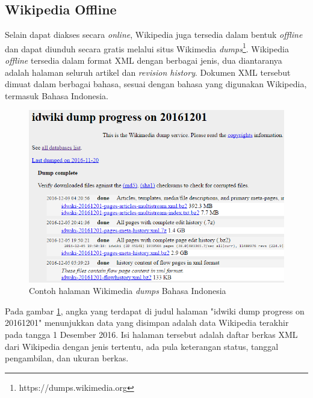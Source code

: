 \subsection{Wikipedia Offline}
Selain dapat diakses secara \textit{online}, Wikipedia juga tersedia dalam bentuk \textit{offline} dan dapat diunduh secara gratis melalui situs Wikimedia \textit{dumps}\footnote{https://dumps.wikimedia.org}. Wikipedia \textit{offline} tersedia dalam format XML dengan berbagai jenis, dua diantaranya adalah halaman seluruh artikel dan \textit{revision history}. Dokumen XML tersebut dimuat dalam berbagai bahasa, sesuai dengan bahasa yang digunakan Wikipedia, termasuk Bahasa Indonesia. 
\begin{figure}
	\centering
	\includegraphics[width=1\linewidth]{pics/wikidumps}
	\caption{Contoh halaman Wikimedia \textit{dumps} Bahasa Indonesia}
	\label{fig:wikidumps}
\end{figure}
\noindent Pada gambar \ref{fig:wikidumps}, angka yang terdapat di judul halaman "idwiki dump progress on 20161201" menunjukkan data yang disimpan adalah data Wikipedia terakhir pada tangga 1 Desember 2016. Isi halaman tersebut adalah daftar berkas XML dari Wikipedia dengan jenis tertentu, ada pula keterangan status, tanggal pengambilan, dan ukuran berkas.		


